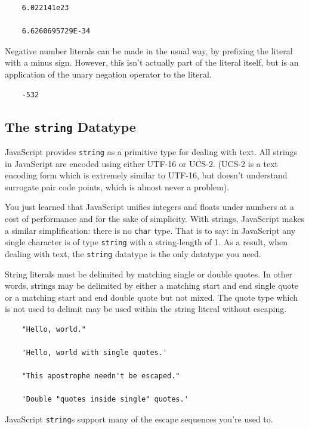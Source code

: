 \documentclass[11pt,letter]{book}
\begin{document}
    \begin{verbatim}
    6.022141e23
    
    6.6260695729E-34
    \end{verbatim}
    
    Negative number literals can be made in the usual way, by prefixing the literal with a minus 
    sign. However, this isn't actually part of the literal itself, but is an application of the 
    unary negation operator to the literal.
    
    \begin{verbatim}
    -532
    \end{verbatim}
    
    \subsection{The \texttt{string} Datatype}
    JavaScript provides \texttt{string} as a primitive type for dealing with text. All strings in 
    JavaScript are encoded using either UTF-16 or UCS-2. (UCS-2 is a text encoding form which is 
    extremely similar to UTF-16, but doesn't understand surrogate pair code points, which is almost
    never a problem).
    
    You just learned that JavaScript unifies integers and floats under numbers at a cost of 
    performance and for the sake of simplicity. With strings, JavaScript makes a similar 
    simplification: there is no \texttt{char} type. That is to say: in JavaScript any single 
    character is of type \texttt{string} with a string-length of 1. As a result, when dealing with  
    text, the \texttt{string} datatype is the only datatype you need.
    
    String literals must be delimited by matching single or double quotes. In other words, strings 
    may be delimited by either a matching start and end single quote or a matching start and end 
    double quote but not mixed. The quote type which is not used to delimit may be used within the 
    string literal without escaping.
    
    \begin{verbatim}
    "Hello, world."
    
    'Hello, world with single quotes.'
    
    "This apostrophe needn't be escaped."
    
    'Double "quotes inside single" quotes.'
    \end{verbatim}
    
    JavaScript \texttt{string}s support many of the escape sequences you're used to.
    
\end{document}
